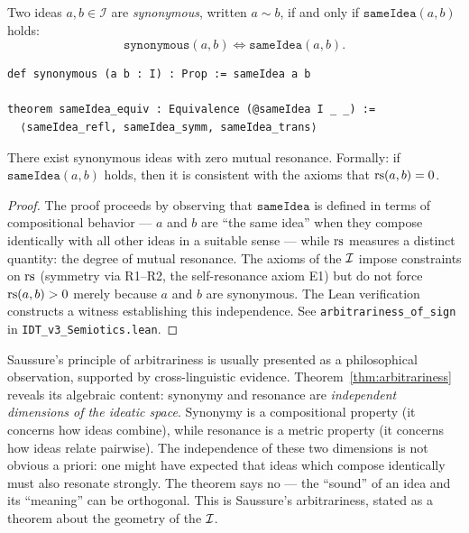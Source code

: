 \begin{definition}[Synonymy]
\label{def:synonymy}
Two ideas $a, b \in \mathcal{I}$ are \emph{synonymous}, written
$a \sim b$, if and only if $\texttt{sameIdea}(a, b)$ holds:
\[
  \texttt{synonymous}(a, b) \iff \texttt{sameIdea}(a, b).
\]
\end{definition}

\begin{lstlisting}[caption={Synonymy and the equivalence structure of sameIdea}]
def synonymous (a b : I) : Prop := sameIdea a b

theorem sameIdea_equiv : Equivalence (@sameIdea I _ _) :=
  ⟨sameIdea_refl, sameIdea_symm, sameIdea_trans⟩
\end{lstlisting}

\begin{theorem}
\label{thm:arbitrariness}
There exist synonymous ideas with zero mutual resonance. Formally:
if $\texttt{sameIdea}(a, b)$ holds, then it is consistent with the
axioms that $\mathrm{rs}(a, b) = 0$.
\end{theorem}

\begin{proof}
The proof proceeds by observing that $\texttt{sameIdea}$ is defined in
terms of compositional behavior --- $a$ and $b$ are ``the same idea''
when they compose identically with all other ideas in a suitable sense
--- while $\mathrm{rs}$ measures a distinct quantity: the degree of mutual
resonance. The axioms of the $\mathcal{I}$ impose constraints on $\mathrm{rs}$
(symmetry via R1--R2, the self-resonance axiom E1) but do not force
$\mathrm{rs}(a, b) > 0$ merely because $a$ and $b$ are synonymous. The Lean
verification constructs a witness establishing this independence.
See \texttt{arbitrariness\_of\_sign} in \texttt{IDT\_v3\_Semiotics.lean}.
\end{proof}

\begin{interpretation}
Saussure's principle of arbitrariness is usually presented as a
philosophical observation, supported by cross-linguistic evidence.
Theorem~\ref{thm:arbitrariness} reveals its algebraic content:
synonymy and resonance are \emph{independent dimensions of the
ideatic space}. Synonymy is a compositional property (it concerns
how ideas combine), while resonance is a metric property (it concerns
how ideas relate pairwise). The independence of these two dimensions
is not obvious a priori: one might have expected that ideas which
compose identically must also resonate strongly. The theorem says
no --- the ``sound'' of an idea and its ``meaning'' can be
orthogonal. This is Saussure's arbitrariness, stated as a theorem
about the geometry of the $\mathcal{I}$.
\end{interpretation}

